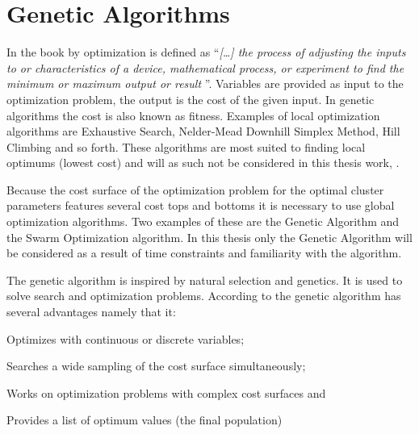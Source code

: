 \section{Genetic Algorithms}
\label{GeneticAlgorithm}
In the book  by \cite{Haupt2004} optimization is defined as ``\textit{[\dots] the process of adjusting the inputs to or characteristics of a device, mathematical process, or experiment to find the minimum or maximum output or result }''. Variables are provided as input to the optimization problem, the output is the cost of the given input. In genetic algorithms the cost is also known as fitness. Examples of local optimization algorithms are Exhaustive Search, Nelder-Mead Downhill Simplex Method, Hill Climbing and so forth. These algorithms are most suited to finding local optimums (lowest cost) and will as such not be considered in this thesis work, \parencite{Haupt2004}.

Because the cost surface of the optimization problem for the optimal \CTC cluster parameters features several cost tops and bottoms it is necessary to use global optimization algorithms. Two examples of these are the Genetic Algorithm and the Swarm Optimization algorithm. In this thesis only the Genetic Algorithm will be considered as a result of time constraints and familiarity with the algorithm.

The genetic algorithm is inspired by natural selection and genetics. It is used to solve search and optimization problems. According to \citeauthor[23]{Haupt2004} the genetic algorithm has several advantages namely that it:
\begin{inparaenum}[\itshape 1\upshape)]
\item Optimizes with continuous or discrete variables;
\item Searches a wide sampling of the cost surface simultaneously;
\item Works on optimization problems with complex cost surfaces and
\item Provides a list of optimum values (the final population) 
\end{inparaenum}

